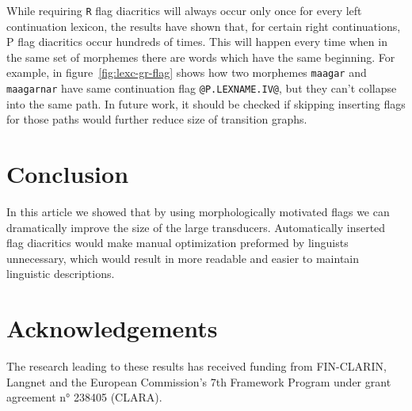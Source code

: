 \documentclass[10pt, a4paper]{article}
\begin{document}
While requiring {\tt R} flag diacritics will always occur only once
for every left continuation lexicon, the results have shown that, for
certain right continuations, P flag diacritics occur hundreds of
times. This will happen every time when in the same set of morphemes
there are words which have the same beginning. For example, in
figure~\ref{fig:lexc-gr-flag} shows how two morphemes \texttt{maagar}
and \texttt{maagarnar} have same continuation flag
\verb+@P.LEXNAME.IV@+, but they can't collapse into the same path. In future
work, it should be checked if skipping inserting flags for those paths would
further reduce size of transition graphs.




\section{Conclusion}
\label{sec:conclusion}

In this article we showed that by using morphologically motivated
flags we can dramatically improve the size of the large transducers.  Automatically
inserted flag diacritics would make manual optimization preformed by
linguists unnecessary, which would result in more readable and easier
to maintain linguistic descriptions.

\section{Acknowledgements}
The research leading to these results has received funding from FIN-CLARIN, Langnet and the
European Commission's 7th Framework Program under grant agreement n° 238405 (CLARA).



\end{document}

